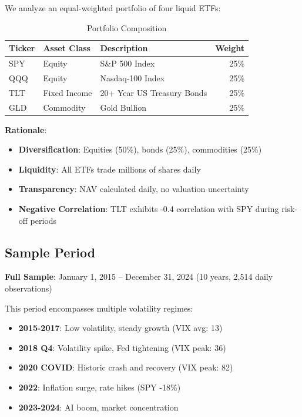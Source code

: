 \documentclass[12pt,a4paper]{article}
\begin{document}
We analyze an equal-weighted portfolio of four liquid ETFs:

\begin{table}[H]
\centering
\begin{tabular}{@{}lllr@{}}
\toprule
\textbf{Ticker} & \textbf{Asset Class} & \textbf{Description} & \textbf{Weight} \\ \midrule
SPY & Equity & S\&P 500 Index & 25\% \\
QQQ & Equity & Nasdaq-100 Index & 25\% \\
TLT & Fixed Income & 20+ Year US Treasury Bonds & 25\% \\
GLD & Commodity & Gold Bullion & 25\% \\ \bottomrule
\end{tabular}
\caption{Portfolio Composition}
\end{table}

\textbf{Rationale}:
\begin{itemize}
    \item \textbf{Diversification}: Equities (50\%), bonds (25\%), commodities (25\%)
    \item \textbf{Liquidity}: All ETFs trade millions of shares daily
    \item \textbf{Transparency}: NAV calculated daily, no valuation uncertainty
    \item \textbf{Negative Correlation}: TLT exhibits -0.4 correlation with SPY during risk-off periods
\end{itemize}

\subsection{Sample Period}

\textbf{Full Sample}: January 1, 2015 – December 31, 2024 (10 years, 2,514 daily observations)

This period encompasses multiple volatility regimes:
\begin{itemize}
    \item \textbf{2015-2017}: Low volatility, steady growth (VIX avg: 13)
    \item \textbf{2018 Q4}: Volatility spike, Fed tightening (VIX peak: 36)
    \item \textbf{2020 COVID}: Historic crash and recovery (VIX peak: 82)
    \item \textbf{2022}: Inflation surge, rate hikes (SPY -18\%)
    \item \textbf{2023-2024}: AI boom, market concentration
\end{itemize}
\end{document}

